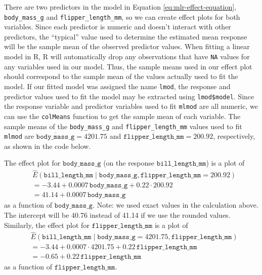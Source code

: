 \documentclass[
]{book}
\newenvironment{Shaded}{\begin{snugshade}}{\end{snugshade}}
\newcommand{\DocumentationTok}[1]{\textcolor[rgb]{0.56,0.35,0.01}{\textbf{\textit{#1}}}}
\newcommand{\FunctionTok}[1]{\textcolor[rgb]{0.00,0.00,0.00}{#1}}
\newcommand{\NormalTok}[1]{#1}
\newcommand{\SpecialCharTok}[1]{\textcolor[rgb]{0.00,0.00,0.00}{#1}}
\theoremstyle{definition}
\theoremstyle{definition}
\theoremstyle{definition}
\theoremstyle{definition}
\theoremstyle{remark}
\begin{document}
There are two predictors in the model in Equation
\eqref{eq:mlr-effect-equation}, \texttt{body\_mass\_g} and \texttt{flipper\_length\_mm}, so
we can create effect plots for both variables. Since each predictor is
numeric and doesn't interact with other predictors, the ``typical'' value
used to determine the estimated mean response will be the sample mean of
the observed predictor values. When fitting a linear model in R, R will
automatically drop any observations that have \texttt{NA} values for any
variables used in our model. Thus, the sample means used in our effect
plot should correspond to the sample mean of the values actually used to
fit the model. If our fitted model was assigned the name \texttt{lmod}, the
response and predictor values used to fit the model may be extracted
using \texttt{lmod\$model}. Since the response variable and predictor variables
used to fit \texttt{mlmod} are all numeric, we can use the \texttt{colMeans} function
to get the sample mean of each variable. The sample means of the
\texttt{body\_mass\_g} and \texttt{flipper\_length\_mm} values used to fit \texttt{mlmod} are
\(\overline{\mathtt{body\_mass\_g}}=4201.75\) and
\(\overline{\mathtt{flipper\_length\_mm}}=200.92\), respectively, as shown
in the code below.

\begin{Shaded}
\end{Shaded}

The effect plot for \(\mathtt{body\_mass\_g}\) (on the response
\(\mathtt{bill\_length\_mm}\)) is a plot of \[
\begin{aligned}
&\hat{E}(\mathtt{bill\_length\_mm}\mid \mathtt{body\_mass\_g}, \mathtt{flipper\_length\_mm} = 200.92)\\
&=-3.44+0.0007 \,\mathtt{body\_mass\_g}+0.22\cdot 200.92 \\
&=41.14+0.0007 \,\mathtt{body\_mass\_g}
\end{aligned}
\] as a function of \(\mathtt{body\_mass\_g}\). Note: we used exact values
in the calculation above. The intercept will be 40.76 instead of 41.14
if we use the rounded values. Similarly, the effect plot for
\(\mathtt{flipper\_length\_mm}\) is a plot of \[
\begin{aligned}
&\hat{E}(\mathtt{bill\_length\_mm}\mid \mathtt{body\_mass\_g} = 4201.75,\mathtt{flipper\_length\_mm}) \\
&=-3.44+0.0007 \cdot 4201.75+0.22\,\mathtt{flipper\_length\_mm} \\
&=-0.65 + 0.22\,\mathtt{flipper\_length\_mm}
\end{aligned}
\] as a function of \(\mathtt{flipper\_length\_mm}\).
\end{document}
